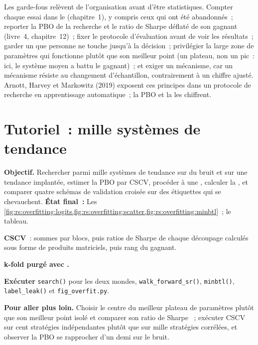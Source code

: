 Les garde-fous relèvent de l'organisation avant d'être statistiques. Compter chaque essai dans le  (chapitre~1), y compris ceux qui ont été abandonnés~; reporter la PBO de la
recherche et le ratio de Sharpe déflaté de son gagnant (livre~4, chapitre~12)~; fixer le protocole d'évaluation avant de voir les résultats~; garder un  que personne ne touche
jusqu'à la décision~; privilégier la large zone de paramètres qui fonctionne plutôt que son meilleur point (un plateau, non un pic~: ici, le système moyen a battu le gagnant)~; et
exiger un mécanisme, car un mécanisme résiste au changement d'échantillon, contrairement à un chiffre ajusté. Arnott, Harvey et Markowitz (2019) exposent ces principes dans un
protocole de recherche en apprentissage automatique~; la PBO et la  les chiffrent.

\section{Tutoriel~: mille systèmes de tendance}\label{tut:rs:overfitting:tut}

\begin{tutorial}
\textbf{Objectif.} Rechercher parmi mille systèmes de tendance sur du bruit et sur une tendance implantée, estimer la PBO par CSCV, procéder à une , calculer la , et
comparer quatre schémas de validation croisée sur des étiquettes qui se chevauchent. \textbf{État final~:}
Les \cref{fig:rs:overfitting:logits,fig:rs:overfitting:scatter,fig:rs:overfitting:minbtl}~; le tableau.
\begin{tutsteps}
\item \textbf{CSCV}~: sommes par blocs, puis ratios de Sharpe de chaque découpage calculés sous forme de produits matriciels, puis rang  du gagnant.
\label{lst:rs:overfitting:cscv}
\item \textbf{k-fold purgé avec .}
\label{lst:rs:overfitting:purge}
\item \textbf{Exécuter} \texttt{search()} pour les deux mondes, \texttt{walk\_forward\_sr()}, \texttt{minbtl()}, \texttt{label\_leak()} et \texttt{fig\_overfit.py}.
\end{tutsteps}
\textbf{Pour aller plus loin.} Choisir le centre du meilleur plateau de paramètres plutôt que son meilleur point isolé et comparer son ratio de Sharpe ~; exécuter
CSCV sur cent stratégies indépendantes plutôt que sur mille stratégies corrélées, et observer la PBO se rapprocher d'un demi sur le bruit.
\end{tutorial}

